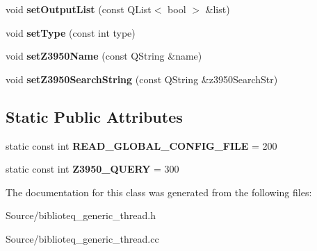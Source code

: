 \begin{DoxyCompactItemize}
\item 
void {\bfseries set\+Output\+List} (const Q\+List$<$ bool $>$ \&list)\hypertarget{classbiblioteq__generic__thread_a2359d6a207d8371950c401943fdccfb5}{}\label{classbiblioteq__generic__thread_a2359d6a207d8371950c401943fdccfb5}

\item 
void {\bfseries set\+Type} (const int type)\hypertarget{classbiblioteq__generic__thread_a4b131d5b5c10ccd37ad661942901c4bb}{}\label{classbiblioteq__generic__thread_a4b131d5b5c10ccd37ad661942901c4bb}

\item 
void {\bfseries set\+Z3950\+Name} (const Q\+String \&name)\hypertarget{classbiblioteq__generic__thread_ac2b8101dbdb8a88a26e6cdac2d6eba3d}{}\label{classbiblioteq__generic__thread_ac2b8101dbdb8a88a26e6cdac2d6eba3d}

\item 
void {\bfseries set\+Z3950\+Search\+String} (const Q\+String \&z3950\+Search\+Str)\hypertarget{classbiblioteq__generic__thread_a0cc89d4c9c91da393e9970d6630f7b13}{}\label{classbiblioteq__generic__thread_a0cc89d4c9c91da393e9970d6630f7b13}

\end{DoxyCompactItemize}
\subsection*{Static Public Attributes}
\begin{DoxyCompactItemize}
\item 
static const int {\bfseries R\+E\+A\+D\+\_\+\+G\+L\+O\+B\+A\+L\+\_\+\+C\+O\+N\+F\+I\+G\+\_\+\+F\+I\+LE} = 200\hypertarget{classbiblioteq__generic__thread_a71ba3bd3edb966a8fae757d9f9190afa}{}\label{classbiblioteq__generic__thread_a71ba3bd3edb966a8fae757d9f9190afa}

\item 
static const int {\bfseries Z3950\+\_\+\+Q\+U\+E\+RY} = 300\hypertarget{classbiblioteq__generic__thread_a27d3813d7a948e36d540984c0f10512c}{}\label{classbiblioteq__generic__thread_a27d3813d7a948e36d540984c0f10512c}

\end{DoxyCompactItemize}


The documentation for this class was generated from the following files\+:\begin{DoxyCompactItemize}
\item 
Source/biblioteq\+\_\+generic\+\_\+thread.\+h\item 
Source/biblioteq\+\_\+generic\+\_\+thread.\+cc\end{DoxyCompactItemize}
